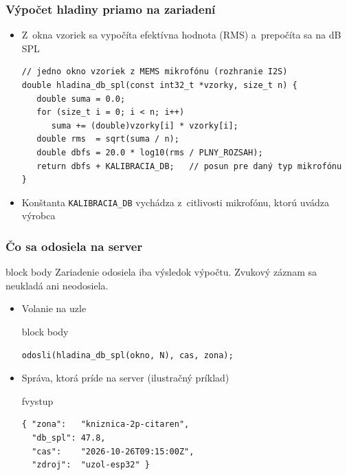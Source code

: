 \documentclass{beamer}
\newcommand{\id}[1]{\texttt{#1}}
\newenvironment{program}{\begin{beamercolorbox}[rounded=true,shadow=true]{block body}\vspace{-4mm}}{\vspace{-2mm}\end{beamercolorbox}}
\newenvironment{vystup}{\begin{beamercolorbox}[rounded=true,shadow=true]{fvystup}}{\end{beamercolorbox}}
\newenvironment{poznamka}{\begin{beamercolorbox}[rounded=true,shadow=false]{block body}}{\end{beamercolorbox}}
\begin{document}
\begin{frame}[fragile=singleslide]\frametitle{Výpočet hladiny priamo na zariadení}
\begin{itemize}
\item Z~okna vzoriek sa vypočíta efektívna hodnota (RMS) a~prepočíta sa na dB SPL
\begin{lstlisting}
// jedno okno vzoriek z MEMS mikrofónu (rozhranie I2S)
double hladina_db_spl(const int32_t *vzorky, size_t n) {
   double suma = 0.0;
   for (size_t i = 0; i < n; i++)
      suma += (double)vzorky[i] * vzorky[i];
   double rms  = sqrt(suma / n);
   double dbfs = 20.0 * log10(rms / PLNY_ROZSAH);
   return dbfs + KALIBRACIA_DB;   // posun pre daný typ mikrofónu
}
\end{lstlisting}

\item Konštanta \id{KALIBRACIA\_DB} vychádza z~citlivosti mikrofónu, ktorú uvádza výrobca
\end{itemize}
\end{frame}


\begin{frame}[fragile=singleslide]\frametitle{Čo sa odosiela na server}
\begin{poznamka}
Zariadenie odosiela iba výsledok výpočtu. Zvukový záznam sa neukladá ani neodosiela.
\end{poznamka}

\begin{itemize}
\item Volanie na uzle

\begin{program}
\begin{lstlisting}
odosli(hladina_db_spl(okno, N), cas, zona);
\end{lstlisting}
\end{program}

\item Správa, ktorá príde na server (ilustračný príklad)
\begin{vystup}
\begin{lstlisting}[language={},basicstyle=\ttfamily\fontsize{8}{9.6}\selectfont]
{ "zona":   "kniznica-2p-citaren",
  "db_spl": 47.8,
  "cas":    "2026-10-26T09:15:00Z",
  "zdroj":  "uzol-esp32" }
\end{lstlisting}
\end{vystup}

\end{itemize}
\end{frame}
\end{document}
